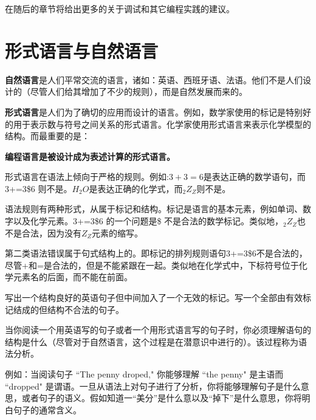 在随后的章节将给出更多的关于调试和其它编程实践的建议。

\section{形式语言与自然语言}
\textbf{自然语言}是人们平常交流的语言，诸如：英语、西班牙语、法语。他们不是人们设计的（尽管人们给其增加了不少的规则），而是自然发展而来的。

\textbf{形式语言}是人们为了确切的应用而设计的语言。例如，数学家使用的标记是特别好的用于表示数与符号之间关系的形式语言。化学家使用形式语言来表示化学模型的结构。而最重要的是：

\textbf{编程语言是被设计成为表述计算的形式语言。}

形式语言在语法上倾向于严格的规则。例如:$3+3=6$是表达正确的数学语句，而3+=3\$6 则不是。$H_2O$是表达正确的化学式，而$_2Z_Z$则不是。

语法规则有两种形式，从属于标记和结构。标记是语言的基本元素，例如单词、数字以及化学元素。3+=3\$6 的一个问题是\$ 不是合法的数学标记。类似地，$_2Z_Z$也不是合法，因为没有$Z_Z$元素的缩写。

第二类语法错误属于句式结构上的。即标记的排列规则语句3+=3\$6不是合法的，尽管+和=是合法的，但是不能紧跟在一起。类似地在化学式中，下标符号位于化学元素名的后面，而不能在前面。
\begin{exercise}
写出一个结构良好的英语句子但中间加入了一个无效的标记。写一个全部由有效标记结成的但结构不合法的句子。
\end{exercise}
当你阅读一个用英语写的句子或者一个用形式语言写的句子时，你必须理解语句的结构是什么（尽管对于自然语言，这个过程是在潜意识中进行的）。该过程称为语法分析。

例如：当阅读句子 “The penny droped," 你能够理解 “the penny" 是主语而 “drop\-ped" 是谓语。一旦从语法上对句子进行了分析，你将能够理解句子是什么意思，或者句子的语义。假如知道一“美分”是什么意以及“掉下”是什么意思，你将明白句子的通常含义。

